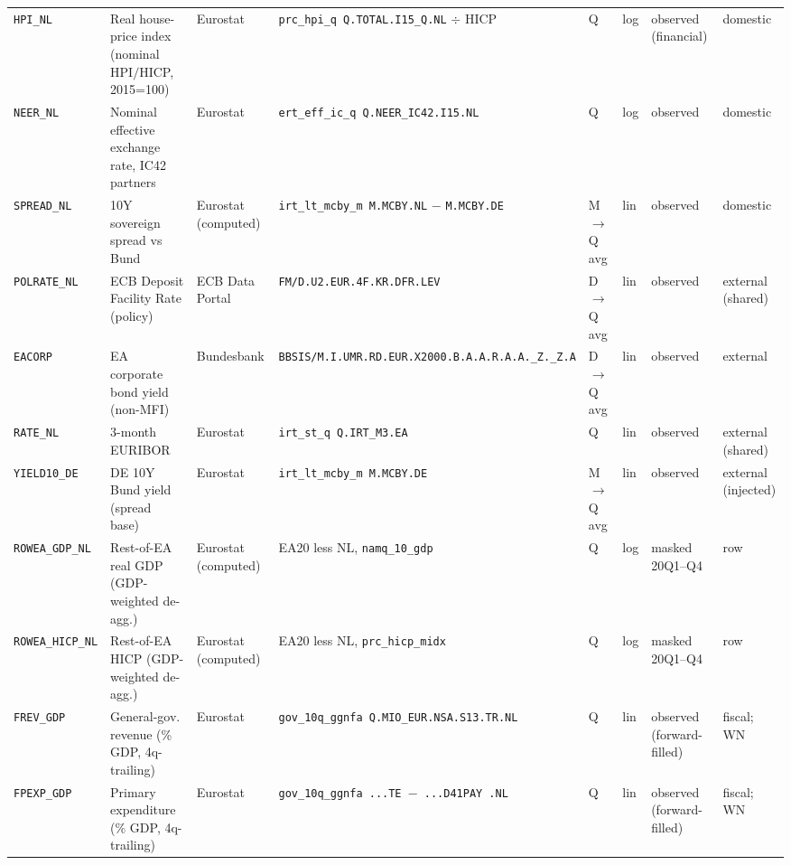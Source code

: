 \begin{longtable}{@{}p{}p{}p{}p{}p{}p{}p{}p{}@{}}
\texttt{HPI\_NL}    & Real house-price index (nominal HPI$/$HICP, 2015=100) & Eurostat & \texttt{prc\_hpi\_q Q.\allowbreak TOTAL.\allowbreak I15\_Q.\allowbreak NL} $\div$ HICP & Q & log & observed (financial) & domestic \\
\texttt{NEER\_NL}   & Nominal effective exchange rate, IC42 partners & Eurostat & \texttt{ert\_eff\_ic\_q Q.\allowbreak NEER\_IC42.\allowbreak I15.\allowbreak NL} & Q & log & observed & domestic \\
\texttt{SPREAD\_NL} & 10Y sovereign spread vs Bund & Eurostat (computed) & \texttt{irt\_lt\_mcby\_m M.\allowbreak MCBY.\allowbreak NL} $-$ \texttt{M.\allowbreak MCBY.\allowbreak DE} & M$\to$Q avg & lin & observed & domestic \\
\texttt{POLRATE\_NL}& ECB Deposit Facility Rate (policy) & ECB Data Portal & \texttt{FM/D.\allowbreak U2.\allowbreak EUR.4F.\allowbreak KR.\allowbreak DFR.\allowbreak LEV} & D$\to$Q avg & lin & observed & external (shared) \\
\texttt{EACORP}     & EA corporate bond yield (non-MFI) & Bundesbank & \texttt{BBSIS/\allowbreak M.\allowbreak I.\allowbreak UMR.\allowbreak RD.\allowbreak EUR.\allowbreak X2000.\allowbreak B.A.A.\allowbreak R.A.A.\allowbreak \_Z.\_Z.A} & D$\to$Q avg & lin & observed & external \\
\texttt{RATE\_NL}   & 3-month EURIBOR & Eurostat & \texttt{irt\_st\_q Q.\allowbreak IRT\_M3.\allowbreak EA} & Q & lin & observed & external (shared) \\
\texttt{YIELD10\_DE}& DE 10Y Bund yield (spread base) & Eurostat & \texttt{irt\_lt\_mcby\_m M.\allowbreak MCBY.\allowbreak DE} & M$\to$Q avg & lin & observed & external (injected) \\
\texttt{ROWEA\_GDP\_NL}  & Rest-of-EA real GDP (GDP-weighted de-agg.) & Eurostat (computed) & EA20 less NL, \texttt{namq\_10\_gdp} & Q & log & masked 20Q1--Q4 & row \\
\texttt{ROWEA\_HICP\_NL} & Rest-of-EA HICP (GDP-weighted de-agg.) & Eurostat (computed) & EA20 less NL, \texttt{prc\_hicp\_midx} & Q & log & masked 20Q1--Q4 & row \\
\texttt{FREV\_GDP}  & General-gov. revenue (\% GDP, 4q-trailing) & Eurostat & \texttt{gov\_10q\_ggnfa Q.\allowbreak MIO\_EUR.\allowbreak NSA.\allowbreak S13.\allowbreak TR.\allowbreak NL} & Q & lin & observed (forward-filled) & fiscal; WN \\
\texttt{FPEXP\_GDP} & Primary expenditure (\% GDP, 4q-trailing) & Eurostat & \texttt{gov\_10q\_ggnfa ...\allowbreak TE $-$ ...\allowbreak D41PAY .\allowbreak NL} & Q & lin & observed (forward-filled) & fiscal; WN \\

\end{longtable}
